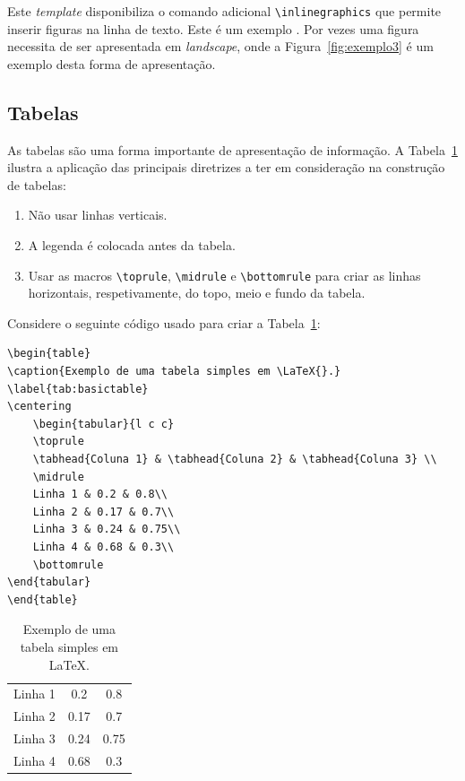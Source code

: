 Este \textit{template} disponibiliza o comando adicional \verb|\inlinegraphics| que permite inserir figuras na linha de texto. Este é um exemplo . Por vezes uma figura necessita de ser apresentada em \textit{landscape}, onde a Figura~\ref{fig:exemplo3} é um exemplo desta forma de apresentação.


\subsection{Tabelas}

As tabelas são uma forma importante de apresentação de informação. A Tabela~\ref{tab:basictable} ilustra a aplicação das principais diretrizes a ter em consideração na construção de tabelas:

\begin{enumerate}
   \item Não usar linhas verticais.
   \item A legenda é colocada antes da tabela.
   \item Usar as macros \verb|\toprule|, \verb|\midrule| e \verb|\bottomrule| para criar as linhas horizontais, respetivamente, do topo, meio e fundo da tabela.
\end{enumerate} 

Considere o seguinte código usado para criar a Tabela~\ref{tab:basictable}:

{\small
\begin{verbatim}
\begin{table}
\caption{Exemplo de uma tabela simples em \LaTeX{}.}
\label{tab:basictable}
\centering
	\begin{tabular}{l c c}
	\toprule
	\tabhead{Coluna 1} & \tabhead{Coluna 2} & \tabhead{Coluna 3} \\
	\midrule
	Linha 1 & 0.2 & 0.8\\
	Linha 2 & 0.17 & 0.7\\
	Linha 3 & 0.24 & 0.75\\
	Linha 4 & 0.68 & 0.3\\
	\bottomrule
\end{tabular}
\end{table}
\end{verbatim}
}

\begin{table}[htb]
	\caption{Exemplo de uma tabela simples em \LaTeX{}.}
	\label{tab:basictable}
	\centering
	\begin{tabular}{l c c}
	\toprule
	\tabhead{Coluna 1} & \tabhead{Coluna 2} & \tabhead{Coluna 3} \\
	\midrule
		Linha 1 & 0.2 & 0.8\\
		Linha 2 & 0.17 & 0.7\\
		Linha 3 & 0.24 & 0.75\\
		Linha 4 & 0.68 & 0.3\\
	\bottomrule
	\end{tabular}
\end{table}

